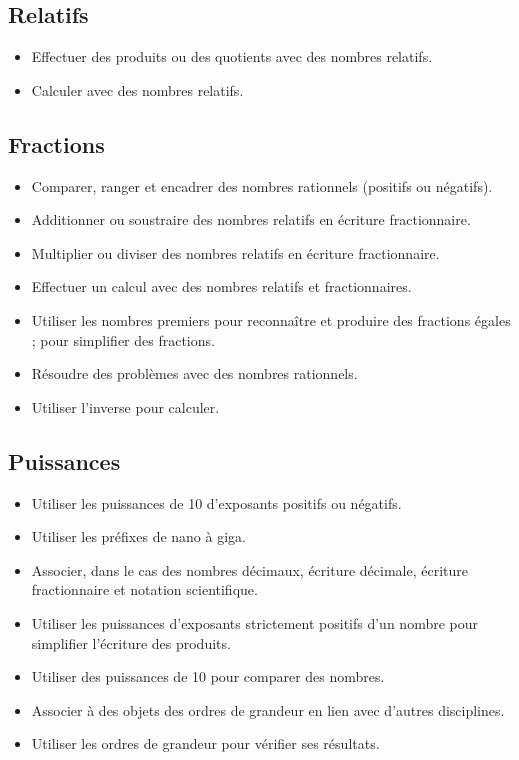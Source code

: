 \documentclass[a4paper,12pt,fleqn]{article}	
\begin{document}
\renewcommand{\labelitemi}{}

\subsection*{Relatifs}

\begin{itemize}
	\item {}Effectuer des produits ou des quotients avec des nombres relatifs.
	\item {}Calculer avec des nombres relatifs.
\end{itemize}

\subsection*{Fractions}

\begin{itemize}
	\item {}Comparer, ranger et encadrer des nombres rationnels (positifs ou négatifs).
	\item {}Additionner ou soustraire des nombres relatifs en écriture fractionnaire.
	\item {}Multiplier ou diviser des nombres relatifs en écriture fractionnaire.
	\item {}Effectuer un calcul avec des nombres relatifs et fractionnaires.
	\item {}Utiliser les nombres premiers pour reconnaître et produire des fractions égales ; pour simplifier des fractions.
	\item {}Résoudre des problèmes avec des nombres rationnels.
	\item {}Utiliser l’inverse pour calculer.
\end{itemize}

\subsection*{Puissances}

\begin{itemize}
	\item {}Utiliser les puissances de 10 d’exposants positifs ou négatifs.
	\item {}Utiliser les préfixes de nano à giga.
	\item {}Associer, dans le cas des nombres décimaux, écriture décimale, écriture fractionnaire et notation scientifique.
	\item {}Utiliser les puissances d’exposants strictement positifs d’un nombre pour simplifier l’écriture des produits.
	\item {}Utiliser des puissances de 10 pour comparer des nombres.
	\item {}Associer à des objets des ordres de grandeur en lien avec d’autres disciplines.
	\item {}Utiliser les ordres de grandeur pour vérifier ses résultats.
\end{itemize}
\end{document}
